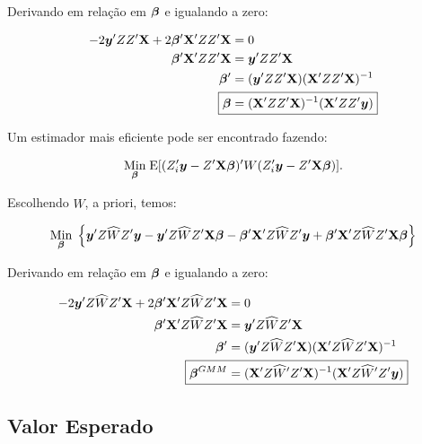 \documentclass[11pt, oneside, a4paper, article]{article}
\numberwithin{equation}{section}
\begin{document}
Derivando em relação em $\boldsymbol{\beta}$ e igualando a zero:

\vspace{-1 em}
\begin{align*}
-2 \mbs{y}' ZZ' \Xmat + 2 \mbs{\beta}'\Xmat' ZZ' \Xmat &= 0
\\
\mbs{\beta}'\Xmat' ZZ' \Xmat &= \mbs{y}' ZZ' \Xmat 
\\
\mbs{\beta}' &= ( \mbs{y}' ZZ' \Xmat ) ( \Xmat' ZZ' \Xmat )^{-1}
\\
\Aboxed{
\mbs{\beta} &= ( \Xmat' ZZ' \Xmat )^{-1} ( \Xmat' ZZ' \mbs{y} ) }
\end{align*}

Um estimador mais eficiente pode ser encontrado fazendo:

\vspace{-1 em}
\begin{align*}
\underset{\boldsymbol{\beta}}{\text{Min}} \;
\text{E}[ ( Z_{i}' \boldsymbol{y} - Z' \mathbf{X} \boldsymbol{\beta} )' W ( Z_{i}' \boldsymbol{y} - Z' \mathbf{X} \boldsymbol{\beta} ) ].
\end{align*}

\noindent
Escolhendo $\widehat{W}$, a priori, temos:

\vspace{-1 em}
\begin{align*}
\underset{\boldsymbol{\beta}}{\text{Min}} \;
\left\{ 
\boldsymbol{y}' Z \widehat{W} Z' \boldsymbol{y}
-
\boldsymbol{y}' Z \widehat{W} Z' \mathbf{X} \boldsymbol{\beta}
-
\boldsymbol{\beta}' \mathbf{X}'  Z \widehat{W} Z' \boldsymbol{y}
+
\boldsymbol{\beta}' \mathbf{X}'  Z \widehat{W} Z' \mathbf{X} \boldsymbol{\beta}
\right\}
\end{align*}

Derivando em relação em $\boldsymbol{\beta}$ e igualando a zero:

\vspace{-1 em}
\begin{align*}
-2 \mbs{y}' Z \widehat{W} Z' \Xmat + 2 \mbs{\beta}'\Xmat' Z \widehat{W} Z' \Xmat &= 0
\\
\mbs{\beta}'\Xmat' Z \widehat{W} Z' \Xmat &= \mbs{y}' Z \widehat{W} Z' \Xmat 
\\
\mbs{\beta}' &= ( \mbs{y}' Z \widehat{W} Z' \Xmat ) ( \Xmat' Z \widehat{W} Z' \Xmat )^{-1}
\\
\Aboxed{
\mbs{\beta}^{GMM} &= ( \Xmat' Z \widehat{W}' Z' \Xmat )^{-1} ( \Xmat' Z \widehat{W}' Z' \mbs{y} ) }
\end{align*}

\subsection*{Valor Esperado} 
\end{document}
